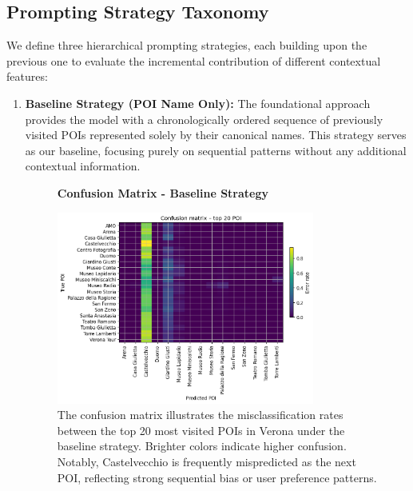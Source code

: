 \documentclass[12pt,a4paper]{article}
\begin{document}
\subsection{Prompting Strategy Taxonomy}

We define three hierarchical prompting strategies, each building upon the previous one to evaluate the incremental contribution of different contextual features:

\begin{enumerate}

\item \textbf{Baseline Strategy (POI Name Only):} The foundational approach provides the model with a chronologically ordered sequence of previously visited POIs represented solely by their canonical names. This strategy serves as our baseline, focusing purely on sequential patterns without any additional contextual information.

\begin{figure}[H]
\centering
\textbf{Confusion Matrix - Baseline Strategy}\par
\vspace{0.5em}
\includegraphics[width=0.8\textwidth]{../img/no_SPACE-GEO_n-1_come_current_POI/confusion_matrix.png}
\caption{The confusion matrix illustrates the misclassification rates between the top 20 most visited POIs in Verona under the baseline strategy. Brighter colors indicate higher confusion. Notably, Castelvecchio is frequently mispredicted as the next POI, reflecting strong sequential bias or user preference patterns.
}
\label{fig:baseline_confusion}
\end{figure}


\end{enumerate}
\end{document}
